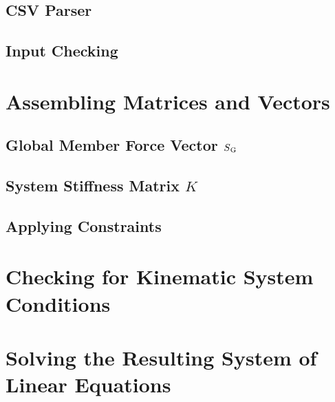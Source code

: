 \subsection{CSV Parser}
\label{sec:csvparse}

\subsection{Input Checking}
\label{sec:inputcheck}


\section{Assembling Matrices and Vectors}
\label{sec:asmmatrvec}

\subsection{Global Member Force Vector $S\textsubscript{G}$}
\label{sec:asmSG}
\subsection{System Stiffness Matrix $K$}
\label{sec:asmK}

\subsection{Applying Constraints}
\label{sec:applyconst}


\section{Checking for Kinematic System Conditions}
\label{sec:kinesyscheck}


\section{Solving the Resulting System of Linear Equations}
\label{sec:solver}
